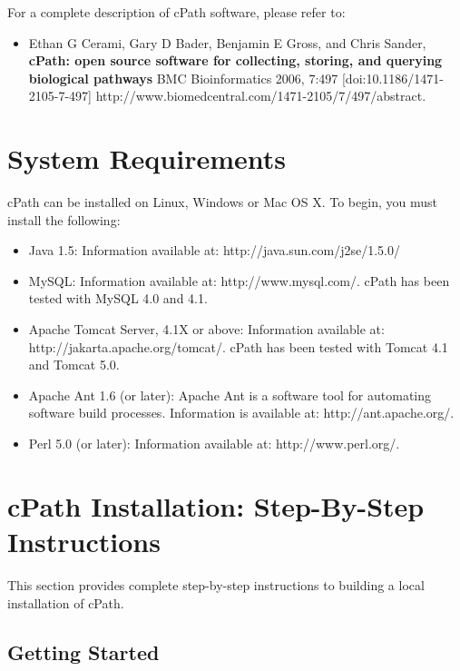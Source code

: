 \documentclass[letterpaper,12pt]{article}
\begin{document}
For a complete description of cPath software, please refer to:

\begin{itemize}
\item Ethan G Cerami, Gary D Bader, Benjamin E Gross, and Chris Sander, \textbf{cPath: open source software for collecting, storing, and querying biological pathways} BMC Bioinformatics 2006, 7:497 [doi:10.1186/1471-2105-7-497]
http://www.biomedcentral.com/1471-2105/7/497/abstract.
\end{itemize}

\section{System Requirements}

cPath can be installed on Linux, Windows or Mac OS X.  To begin, you must install the following:

\begin{itemize}

\item Java 1.5:  Information available at:  http://java.sun.com/j2se/1.5.0/

\item MySQL: Information available at: http://www.mysql.com/.  cPath has been 
tested with MySQL 4.0 and 4.1. 

\item Apache Tomcat Server, 4.1X or above: Information available at: \linebreak
http://jakarta.apache.org/tomcat/.  cPath has been tested with Tomcat 4.1 and Tomcat 5.0. 
 
\item Apache Ant 1.6 (or later): Apache Ant is a software tool for automating software build processes.  Information is available at: http://ant.apache.org/. 
 
\item Perl 5.0 (or later): Information available at: http://www.perl.org/. 

\end {itemize}

\section{cPath Installation:  Step-By-Step Instructions }

This section provides complete step-by-step instructions to building a local installation of cPath.

\subsection{Getting Started}
\end{document}
